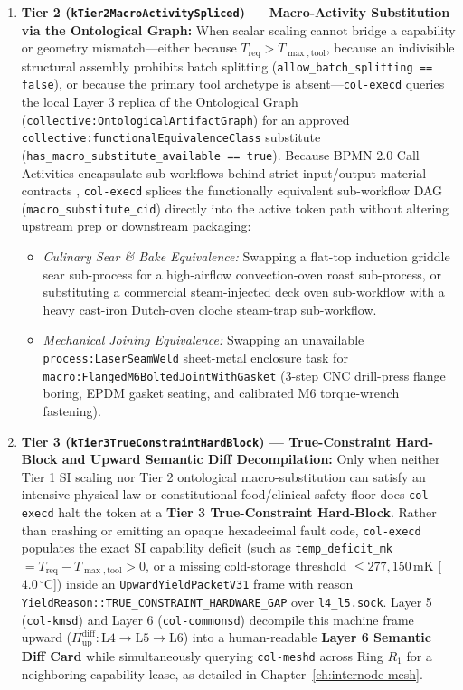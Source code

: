 \begin{enumerate}
    \item \textbf{Tier 2 (\texttt{kTier2MacroActivitySpliced}) --- Macro-Activity Substitution via the Ontological Graph:}
    When scalar scaling cannot bridge a capability or geometry mismatch---either because $T_{\mathrm{req}} > T_{\max,\mathrm{tool}}$, because an indivisible structural assembly prohibits batch splitting (\texttt{allow\_batch\_splitting == false}), or because the primary tool archetype is absent---\texttt{col-execd} queries the local Layer 3 replica of the Ontological Graph (\texttt{collective:OntologicalArtifactGraph}) for an approved \texttt{collective:functionalEquivalenceClass} substitute (\texttt{has\_macro\_substitute\_available == true}). Because BPMN 2.0 Call Activities encapsulate sub-workflows behind strict input/output material contracts \parencite{omg2011bpmn,grieves2014digital}, \texttt{col-execd} splices the functionally equivalent sub-workflow DAG (\texttt{macro\_substitute\_cid}) directly into the active token path without altering upstream prep or downstream packaging:
    \begin{itemize}
        \item \emph{Culinary Sear \& Bake Equivalence:} Swapping a flat-top induction griddle sear sub-process for a high-airflow convection-oven roast sub-process, or substituting a commercial steam-injected deck oven sub-workflow with a heavy cast-iron Dutch-oven cloche steam-trap sub-workflow.
        \item \emph{Mechanical Joining Equivalence:} Swapping an unavailable \texttt{process:LaserSeamWeld} sheet-metal enclosure task for \texttt{macro:FlangedM6BoltedJointWithGasket} (3-step CNC drill-press flange boring, EPDM gasket seating, and calibrated $\mathrm{M6}$ torque-wrench fastening).
    \end{itemize}

    \item \textbf{Tier 3 (\texttt{kTier3TrueConstraintHardBlock}) --- True-Constraint Hard-Block and Upward Semantic Diff Decompilation:}
    Only when neither Tier 1 SI scaling nor Tier 2 ontological macro-substitution can satisfy an intensive physical law or constitutional food/clinical safety floor does \texttt{col-execd} halt the token at a \textbf{Tier 3 True-Constraint Hard-Block}. Rather than crashing or emitting an opaque hexadecimal fault code, \texttt{col-execd} populates the exact SI capability deficit (such as \texttt{temp\_deficit\_mk} $= T_{\mathrm{req}} - T_{\max,\mathrm{tool}} > 0$, or a missing cold-storage threshold $\le 277{,}150\,\mathrm{mK}$ [$4.0\,^\circ\mathrm{C}$]) inside an \texttt{UpwardYieldPacketV31} frame with reason \texttt{YieldReason::TRUE\_CONSTRAINT\_HARDWARE\_GAP} over \texttt{l4\_l5.sock}. Layer 5 (\texttt{col-kmsd}) and Layer 6 (\texttt{col-commonsd}) decompile this machine frame upward ($\Pi_{\mathrm{up}}^{\mathrm{diff}} : \mathrm{L4} \to \mathrm{L5} \to \mathrm{L6}$) into a human-readable \textbf{Layer 6 Semantic Diff Card} while simultaneously querying \texttt{col-meshd} across Ring $R_1$ for a neighboring capability lease, as detailed in Chapter~\ref{ch:internode-mesh}.
\end{enumerate}

